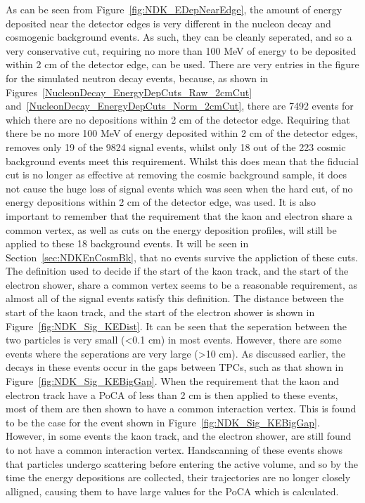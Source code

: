 As can be seen from Figure~\ref{fig:NDK_EDepNearEdge}, the amount of energy deposited near the detector edges is very different in the nucleon decay and cosmogenic background events. As such, they can be cleanly seperated, and so a very conservative cut, requiring no more than 100 MeV of energy to be deposited within 2 cm of the detector edge, can be used. There are very entries in the figure for the simulated neutron decay events, because, as shown in Figures~\ref{NucleonDecay_EnergyDepCuts_Raw_2cmCut} and~\ref{NucleonDecay_EnergyDepCuts_Norm_2cmCut}, there are 7492 events for which there are no depositions within 2 cm of the detector edge. Requiring that there be no more 100 MeV of energy deposited within 2 cm of the detector edges, removes only 19 of the 9824 signal events, whilst only 18 out of the 223 cosmic background events meet this requirement. Whilst this does mean that the fiducial cut is no longer as effective at removing the cosmic background sample, it does not cause the huge loss of signal events which was seen when the hard cut, of no energy depositions within 2 cm of the detector edge, was used. It is also important to remember that the requirement that the kaon and electron share a common vertex, as well as cuts on the energy deposition profiles, will still be applied to these 18 background events. It will be seen in Section~\ref{sec:NDKEnCosmBk}, that no events survive the appliction of these cuts. \\

The definition used to decide if the start of the kaon track, and the start of the electron shower, share a common vertex seems to be a reasonable requirement, as almost all of the signal events satisfy this definition. The distance between the start of the kaon track, and the start of the electron shower is shown in Figure~\ref{fig:NDK_Sig_KEDist}. It can be seen that the seperation between the two particles is very small (<0.1 cm) in most events. However, there are some events where the seperations are very large (>10 cm). As discussed earlier, the decays in these events occur in the gaps between TPCs, such as that shown in Figure~\ref{fig:NDK_Sig_KEBigGap}. When the requirement that the kaon and electron track have a PoCA of less than 2 cm is then applied to these events, most of them are then shown to have a common interaction vertex. This is found to be the case for the event shown in Figure~\ref{fig:NDK_Sig_KEBigGap}. However, in some events the kaon track, and the electron shower, are still found to not have a common interaction vertex. Handscanning of these events shows that particles undergo scattering before entering the active volume, and so by the time the energy depositions are collected, their trajectories are no longer closely alligned, causing them to have large values for the PoCA which is calculated. \\

